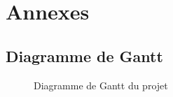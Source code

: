 \chapter{Annexes}

	\section{Diagramme de Gantt}

	\begin{figure}[H]
		\centering
        \label{fig:gantt}
        \caption{Diagramme de Gantt du projet}
	\end{figure}